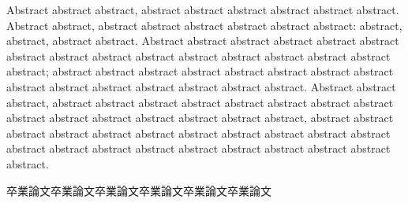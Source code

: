 \documentclass[doctor,interim,11pt]{iscs-thesis}
\date{July 15, 2014}
\begin{document}
\begin{eabstract}
Abstract abstract abstract, 
abstract abstract abstract abstract abstract abstract. 
Abstract abstract, abstract abstract abstract abstract abstract abstract: 
abstract, abstract, abstract abstract. 
Abstract abstract abstract abstract abstract abstract abstract 
abstract abstract abstract abstract abstract abstract abstract 
abstract abstract; 
abstract abstract abstract abstract abstract abstract abstract abstract
abstract abstract abstract abstract abstract abstract abstract. 
Abstract abstract abstract, 
abstract abstract abstract abstract abstract abstract abstract abstract
abstract abstract abstract abstract abstract abstract abstract, 
abstract abstract abstract abstract abstract abstract abstract abstract
abstract abstract abstract abstract abstract abstract abstract 
abstract abstract abstract abstract abstract abstract. 
\end{eabstract}
\begin{jabstract}
卒業論文卒業論文卒業論文卒業論文卒業論文卒業論文
\end{jabstract}
\maketitle
\end{document}
